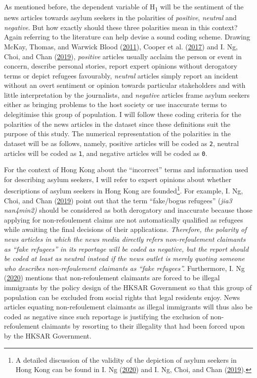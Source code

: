 \documentclass[a4paper, oneside]{report}
\begin{document}
As mentioned before, the dependent variable of H\textsubscript{1} will
be the sentiment of the news articles towards asylum seekers in the
polarities of \emph{positive}, \emph{neutral} and \emph{negative}. But
how exactly should these three polarities mean in this context? Again
referring to the literature can help devise a sound coding scheme.
Drawing McKay, Thomas, and Warwick Blood
(\protect\hyperlink{ref-mckayAnyOneThese2011}{2011}), Cooper et al.
(\protect\hyperlink{ref-cooperMediaCoverageRefugees2017}{2017}) and I.
Ng, Choi, and Chan
(\protect\hyperlink{ref-ngFramingIssueAsylum2019}{2019}),
\emph{positive} articles usually acclaim the person or event in concern,
describe personal stories, report expert opinions without derogatory
terms or depict refugees favourably, \emph{neutral} articles simply
report an incident without an overt sentiment or opinion towards
particular stakeholders and with little interpretation by the
journalists, and \emph{negative} articles frame asylum seekers either as
bringing problems to the host society or use inaccurate terms to
delegitimise this group of population. I will follow these coding
criteria for the polarities of the news articles in the dataset since
these definitions suit the purpose of this study. The numerical
representation of the polarities in the dataset will be as follows,
namely, positive articles will be coded as \texttt{2}, neutral articles
will be coded as \texttt{1}, and negative articles will be coded as
\texttt{0}.

For the context of Hong Kong about the ``incorrect'' terms and
information used for describing asylum seekers, I will refer to expert
opinions about whether descriptions of asylum seekers in Hong Kong are
founded\footnote{A detailed discussion of the validity of the depiction
  of asylum seekers in Hong Kong can be found in I. Ng
  (\protect\hyperlink{ref-ngCriminalizingInnocentsSocial2020}{2020}) and
  I. Ng, Choi, and Chan
  (\protect\hyperlink{ref-ngFramingIssueAsylum2019}{2019}).}. For
example, I. Ng, Choi, and Chan
(\protect\hyperlink{ref-ngFramingIssueAsylum2019}{2019}) point out that
the term ``fake/bogus refugees'' (\emph{jia3 nan4min2)} should be
considered as both derogatory and inaccurate because those applying for
non-refoulement claims are not automatically qualified as refugees while
awaiting the final decisions of their applications. \emph{Therefore, the
polarity of news articles in which the news media directly refers
non-refoulement claimants as ``fake refugees'' in its reportage will be
coded as negative, but the report should be coded at least as neutral
instead if the news outlet is merely quoting someone who describes
non-refoulement claimants as ``fake refugees''.} Furthermore, I. Ng
(\protect\hyperlink{ref-ngCriminalizingInnocentsSocial2020}{2020})
mentions that non-refoulement claimants are forced to be illegal
immigrants by the policy design of the HKSAR Government so that this
group of population can be excluded from social rights that legal
residents enjoy. News articles equating non-refoulement claimants as
illegal immigrants will thus also be coded as negative since such
reportage is justifying the exclusion of non-refoulement claimants by
resorting to their illegality that had been forced upon by the HKSAR
Government.
\end{document}
